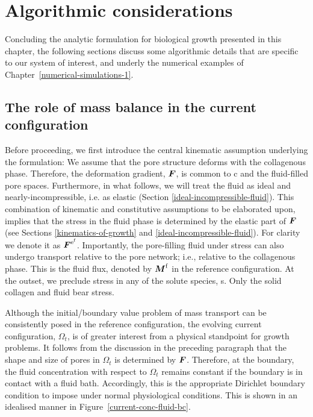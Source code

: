 \section{Algorithmic considerations}
\label{algorithmic-considerations}

Concluding the analytic formulation for biological growth presented in
this chapter, the following sections discuss some algorithmic details
that are specific to our system of interest, and underly the numerical
examples of Chapter~\ref{numerical-simulations-1}.

\subsection{The role of mass balance in the current
  configuration}
\label{role-of-current-mass-balance}


Before proceeding, we first introduce the central kinematic assumption
underlying the formulation: We assume that the pore structure deforms
with the collagenous phase. Therefore, the deformation gradient,
$\mbox{\boldmath$ F$}$, is common to c and the fluid-filled pore spaces. Furthermore,
in what follows, we will treat the fluid as ideal and
nearly-incompressible, i.e. as elastic (Section
\ref{ideal-incompressible-fluid}). This combination of kinematic and
constitutive assumptions to be elaborated upon, implies that the
stress in the fluid phase is determined by the elastic part of $\mbox{\boldmath$ F$}$
(see Sections \ref{kinematics-of-growth} and
\ref{ideal-incompressible-fluid}). For clarity we denote it as
$\mbox{\boldmath$ F$}^{\mathrm{e}^\mathrm{f}}$. Importantly, the pore-filling fluid
under stress can also undergo transport relative to the pore network;
i.e., relative to the collagenous phase. This is the fluid flux,
denoted by $\mbox{\boldmath$ M$}^\mathrm{f}$ in the reference configuration. At the
outset, we preclude stress in any of the solute species, s. Only the
solid collagen and fluid bear stress.

Although the initial/boundary value problem of mass transport can be
consistently posed in the reference configuration, the evolving
current configuration, $\Omega_t$, is of greater interest from a
physical standpoint for growth problems. It follows from the
discussion in the preceding paragraph that the shape and size of pores
in $\Omega_t$ is determined by $\mbox{\boldmath$ F$}$. Therefore, at the boundary, the
fluid concentration with respect to $\Omega_t$ remains constant if the
boundary is in contact with a fluid bath.  Accordingly, this is the
appropriate Dirichlet boundary condition to impose under normal
physiological conditions. This is shown in an idealised manner in
Figure~\ref{current-conc-fluid-bc}.

